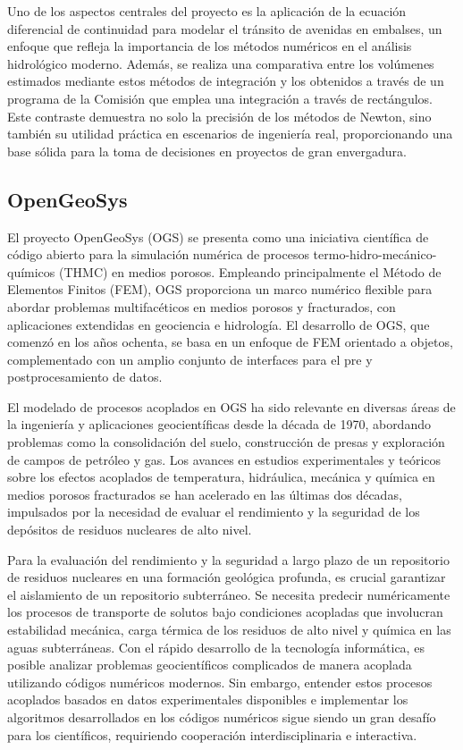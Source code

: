 \documentclass[a4paper]{article}
\begin{document}
    Uno de los aspectos centrales del proyecto es la aplicación de la ecuación diferencial de continuidad para modelar el tránsito de avenidas en embalses, un enfoque que refleja la importancia de los métodos numéricos en el análisis hidrológico moderno. Además, se realiza una comparativa entre los volúmenes estimados mediante estos métodos de integración y los obtenidos a través de un programa de la Comisión que emplea una integración a través de rectángulos. Este contraste demuestra no solo la precisión de los métodos de Newton, sino también su utilidad práctica en escenarios de ingeniería real, proporcionando una base sólida para la toma de decisiones en proyectos de gran envergadura. \cite{newton_method}

    \subsection{OpenGeoSys}
    El proyecto OpenGeoSys (OGS) se presenta como una iniciativa científica de código abierto para la simulación numérica de procesos termo-hidro-mecánico-químicos (THMC) en medios porosos. Empleando principalmente el Método de Elementos Finitos (FEM), OGS proporciona un marco numérico flexible para abordar problemas multifacéticos en medios porosos y fracturados, con aplicaciones extendidas en geociencia e hidrología. El desarrollo de OGS, que comenzó en los años ochenta, se basa en un enfoque de FEM orientado a objetos, complementado con un amplio conjunto de interfaces para el pre y postprocesamiento de datos.

    El modelado de procesos acoplados en OGS ha sido relevante en diversas áreas de la ingeniería y aplicaciones geocientíficas desde la década de 1970, abordando problemas como la consolidación del suelo, construcción de presas y exploración de campos de petróleo y gas. Los avances en estudios experimentales y teóricos sobre los efectos acoplados de temperatura, hidráulica, mecánica y química en medios porosos fracturados se han acelerado en las últimas dos décadas, impulsados por la necesidad de evaluar el rendimiento y la seguridad de los depósitos de residuos nucleares de alto nivel.

    Para la evaluación del rendimiento y la seguridad a largo plazo de un repositorio de residuos nucleares en una formación geológica profunda, es crucial garantizar el aislamiento de un repositorio subterráneo. Se necesita predecir numéricamente los procesos de transporte de solutos bajo condiciones acopladas que involucran estabilidad mecánica, carga térmica de los residuos de alto nivel y química en las aguas subterráneas. Con el rápido desarrollo de la tecnología informática, es posible analizar problemas geocientíficos complicados de manera acoplada utilizando códigos numéricos modernos. Sin embargo, entender estos procesos acoplados basados en datos experimentales disponibles e implementar los algoritmos desarrollados en los códigos numéricos sigue siendo un gran desafío para los científicos, requiriendo cooperación interdisciplinaria e interactiva.\cite{geosys}
\end{document}
